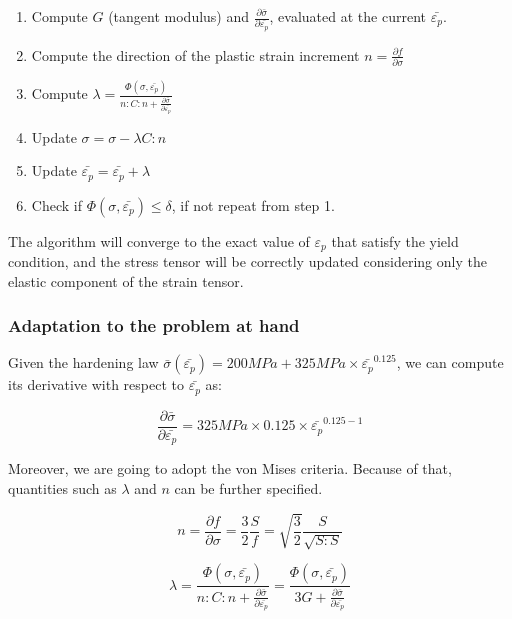 \begin{enumerate}
    \item Compute $G$ (tangent modulus) and $\frac{\partial \bar{\sigma}}{\partial \bar{\varepsilon_p}}$, evaluated at the current $\bar{\varepsilon_p}$.
    \item Compute the direction of the plastic strain increment $n = \frac{\partial f}{\partial \sigma}$
    \item Compute $\lambda = \frac{\Phi(\sigma, \bar{\varepsilon_p})}{n : C : n + \frac{\partial \bar{\sigma}}{\partial \bar{\varepsilon_p}}}$
    \item Update $\sigma = \sigma - \lambda C : n$
    \item Update $\bar{\varepsilon_p} = \bar{\varepsilon_p} + \lambda$
    \item Check if $\Phi(\sigma, \bar{\varepsilon_p}) \le \delta$, if not repeat from step 1.
\end{enumerate}

The algorithm will converge to the exact value of $\varepsilon_p$ that satisfy the yield condition, and the stress tensor will be correctly updated considering only the elastic component of the strain tensor.


\subsubsection{Adaptation to the problem at hand}

Given the hardening law $\bar{\sigma}(\bar{\varepsilon_p}) = 200MPa + 325MPa \times \bar{\varepsilon_p}^{0.125}$, we can compute its derivative with respect to $\bar{\varepsilon_p}$ as:

\begin{equation}
    \frac{\partial \bar{\sigma}}{\partial \bar{\varepsilon_p}} = 325MPa \times 0.125 \times \bar{\varepsilon_p}^{0.125-1}
\end{equation}

Moreover, we are going to adopt the von Mises criteria.
Because of that, quantities such as $\lambda$ and $n$ can be further specified.

\begin{equation}
    n = \frac{\partial f}{\partial \sigma} = \frac{3}{2} \frac{S}{f} = \sqrt{\frac{3}{2}} \frac{S}{\sqrt{S : S}}
\end{equation}

\begin{equation}
    \lambda = \frac{\Phi(\sigma, \bar{\varepsilon_p})}{n : C : n + \frac{\partial \bar{\sigma}}{\partial \bar{\varepsilon_p}}} = \frac{\Phi(\sigma, \bar{\varepsilon_p})}{3G + \frac{\partial \bar{\sigma}}{\partial \bar{\varepsilon_p}}}
\end{equation}

